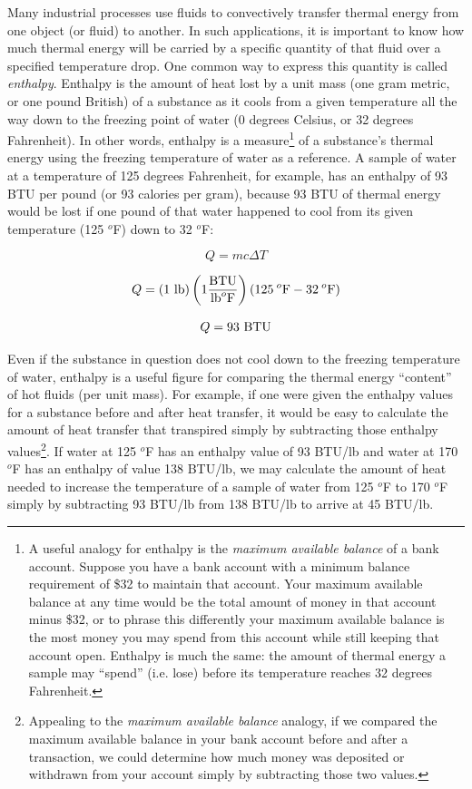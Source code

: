 \vskip 10pt

\filbreak

Many industrial processes use fluids to convectively transfer thermal energy from one object (or fluid) to another.  In such applications, it is important to know how much thermal energy will be carried by a specific quantity of that fluid over a specified temperature drop.  One common way to express this quantity is called \textit{enthalpy}.  Enthalpy is the amount of heat lost by a unit mass (one gram metric, or one pound British) of a substance as it cools from a given temperature all the way down to the freezing point of water (0 degrees Celsius, or 32 degrees Fahrenheit).  In other words, enthalpy is a measure\footnote{A useful analogy for enthalpy is the \textit{maximum available balance} of a bank account.  Suppose you have a bank account with a minimum balance requirement of \$32 to maintain that account.  Your maximum available balance at any time would be the total amount of money in that account minus \$32, or to phrase this differently your maximum available balance is the most money you may spend from this account while still keeping that account open.  Enthalpy is much the same: the amount of thermal energy a sample may ``spend'' (i.e. lose) before its temperature reaches 32 degrees Fahrenheit.} of a substance's thermal energy using the freezing temperature of water as a reference.  A sample of water at a temperature of 125 degrees Fahrenheit, for example, has an enthalpy of 93 BTU per pound (or 93 calories per gram), because 93 BTU of thermal energy would be lost if one pound of that water happened to cool from its given temperature (125 $^{o}$F) down to 32 $^{o}$F:  

$$Q = mc \Delta T$$

$$Q = (1 \hbox{ lb})\left(1 {\hbox{BTU} \over {\hbox{lb}^o\hbox{F}}}\right)(125 \> ^o\hbox{F} - 32 \> ^o\hbox{F})$$

$$Q = 93 \hbox{ BTU}$$

Even if the substance in question does not cool down to the freezing temperature of water, enthalpy is a useful figure for comparing the thermal energy ``content'' of hot fluids (per unit mass).  For example, if one were given the enthalpy values for a substance before and after heat transfer, it would be easy to calculate the amount of heat transfer that transpired simply by subtracting those enthalpy values\footnote{Appealing to the \textit{maximum available balance} analogy, if we compared the maximum available balance in your bank account before and after a transaction, we could determine how much money was deposited or withdrawn from your account simply by subtracting those two values.}.  If water at 125 $^{o}$F has an enthalpy value of 93 BTU/lb and water at 170 $^{o}$F has an enthalpy of value 138 BTU/lb, we may calculate the amount of heat needed to increase the temperature of a sample of water from 125 $^{o}$F to 170 $^{o}$F simply by subtracting 93 BTU/lb from 138 BTU/lb to arrive at 45 BTU/lb.

